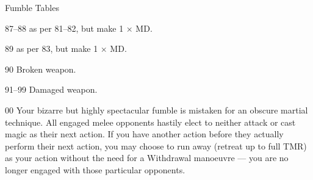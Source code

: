 \begin{Chapter}{Fumble Tables}
\begin{Description}
87–88  as per 81–82, but make 1 × MD. 

\item[89] as per 83, but make 1 × MD.

\item[90] Broken weapon.

\item[91–99] Damaged weapon.

\item[00] Your bizarre but highly spectacular fumble is mistaken for
  an obscure martial technique.  All engaged melee opponents hastily
  elect to neither attack or cast magic as their next action. If you
  have another action before they actually perform their next action,
  you may choose to run away (retreat up to full TMR) as your action
  without the need for a Withdrawal manoeuvre — you are no longer
  engaged with those particular opponents.

\end{Description}

\end{Chapter}
